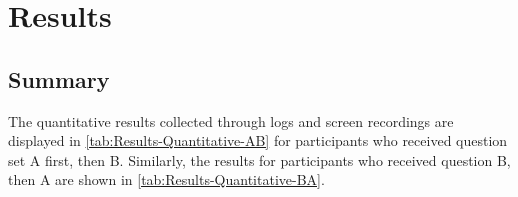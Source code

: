 \section{Results}
\label{sec:Results}

\subsection{Summary}

The quantitative results collected through logs and screen recordings are displayed in \autoref{tab:Results-Quantitative-AB} for participants who received question set A first, then B.
Similarly, the results for participants who received question B, then A are shown in \autoref{tab:Results-Quantitative-BA}.


